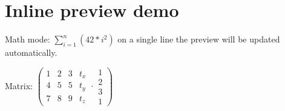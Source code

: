 \documentclass[10pt,a4paper]{article}
\begin{document}
\section{Inline preview demo}
Math mode: $\sum\limits^n_{i=1}\left(42*i^2\right)$
on a single line the preview will be updated automatically.

Matrix: $\left(\begin{matrix}1 & 2 & 3 & t_x \\ 4 & 5 & 5 & t_y \\ 7 & 8 & 9 & t_z \end{matrix} \cdot \begin{matrix} 1\\ 2\\ 3\\ 1\end{matrix}\right)$
\end{document}
